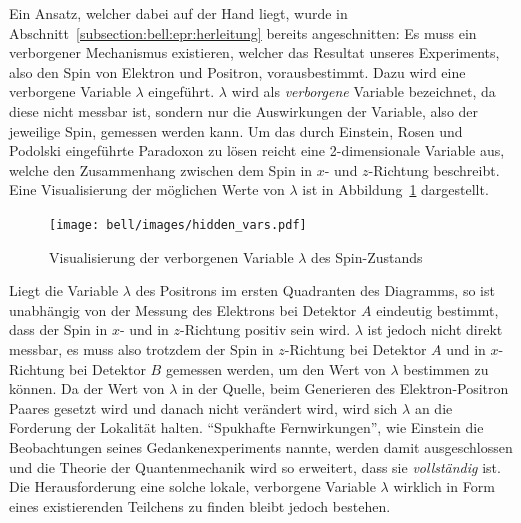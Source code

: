 \begin{refsection}
Ein Ansatz, welcher dabei auf der Hand liegt, wurde in
Abschnitt~\ref{subsection:bell:epr:herleitung} bereits angeschnitten: 
Es muss ein verborgener Mechanismus existieren, welcher das Resultat unseres
Experiments, also den Spin von Elektron und Positron, vorausbestimmt.
Dazu wird eine verborgene Variable $\lambda$ eingef\"uhrt.
$\lambda$ wird als \emph{verborgene} Variable bezeichnet, da diese nicht
messbar ist, sondern nur die Auswirkungen der Variable, also der jeweilige
Spin, gemessen werden kann.
Um das durch Einstein, Rosen und Podolski eingef\"uhrte Paradoxon zu l\"osen
reicht eine 2-dimensionale Variable aus, welche den Zusammenhang zwischen
dem Spin in $x$- und $z$-Richtung beschreibt.
Eine Visualisierung der m\"oglichen Werte von $\lambda$ ist in 
Abbildung~\ref{fig:bell:hidden_var} dargestellt.

\begin{figure}
    \centering
    \texttt{[image: bell/images/hidden\_vars.pdf]}
    \caption{Visualisierung der verborgenen Variable $\lambda$ des Spin-Zustands}
    \label{fig:bell:hidden_var}
\end{figure}

Liegt die Variable $\lambda$ des Positrons im ersten Quadranten des Diagramms,
so ist unabh\"angig von der Messung des Elektrons bei Detektor $A$ eindeutig
bestimmt, dass der Spin in $x$- und in $z$-Richtung positiv sein wird. 
$\lambda$ ist jedoch nicht direkt messbar, es muss also trotzdem der Spin
in $z$-Richtung bei Detektor $A$ und in $x$-Richtung bei Detektor $B$ gemessen
werden, um den Wert von $\lambda$ bestimmen zu k\"onnen.
Da der Wert von $\lambda$ in der Quelle, beim Generieren des Elektron-Positron
Paares gesetzt wird und danach nicht ver\"andert wird, wird sich $\lambda$
an die Forderung der Lokalit\"at halten.
\enquote{Spukhafte Fernwirkungen}, wie Einstein die Beobachtungen seines
Gedankenexperiments nannte, werden damit ausgeschlossen und die Theorie
der Quantenmechanik wird so erweitert, dass sie \emph{vollst\"andig} ist.
Die Herausforderung eine solche lokale, verborgene Variable $\lambda$ wirklich 
in Form eines existierenden Teilchens zu finden bleibt jedoch bestehen.


\end{refsection}
